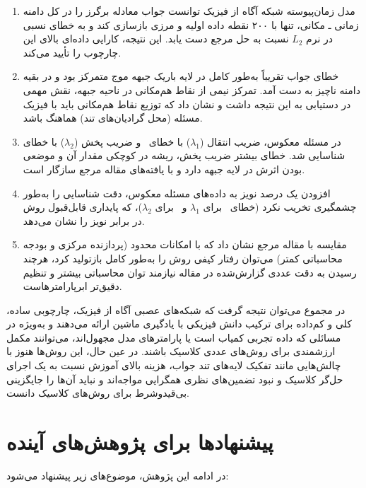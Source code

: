 \begin{enumerate}
\item مدل زمان‌پیوسته شبکه آگاه از فیزیک توانست جواب معادله برگرز را در کل
دامنه زمانی ـ مکانی، تنها با ۲۰۰ نقطه داده اولیه و مرزی بازسازی کند و به
خطای نسبی \FwdRelErr\ در نرم $L_2$ نسبت به حل مرجع دست یابد. این نتیجه،
کارایی داده‌ای بالای این چارچوب را تأیید می‌کند.

\item خطای جواب تقریباً به‌طور کامل در لایه باریک جبهه موج متمرکز بود و در
بقیه دامنه ناچیز به دست آمد. تمرکز نیمی از نقاط هم‌مکانی در ناحیه جبهه،
نقش مهمی در دستیابی به این نتیجه داشت و نشان داد که توزیع نقاط هم‌مکانی
باید با فیزیک مسئله (محل گرادیان‌های تند) هماهنگ باشد.

\item در مسئله معکوس، ضریب انتقال ($\lambda_1$) با خطای \LamIErrClean\ و
ضریب پخش ($\lambda_2$) با خطای \LamIIErrClean\ شناسایی شد. خطای بیشتر ضریب
پخش، ریشه در کوچکی مقدار آن و موضعی بودن اثرش در لایه جبهه دارد و با
یافته‌های مقاله مرجع سازگار است.

\item افزودن یک درصد نویز به داده‌های مسئله معکوس، دقت شناسایی را به‌طور
چشمگیری تخریب نکرد (خطای \LamIErrNoisy\ برای $\lambda_1$ و \LamIIErrNoisy\
برای $\lambda_2$)، که پایداری قابل‌قبول روش در برابر نویز را نشان می‌دهد.

\item مقایسه با مقاله مرجع نشان داد که با امکانات محدود (پردازنده مرکزی و
بودجه محاسباتی کمتر) می‌توان رفتار کیفی روش را به‌طور کامل بازتولید کرد،
هرچند رسیدن به دقت عددی گزارش‌شده در مقاله نیازمند توان محاسباتی بیشتر و
تنظیم دقیق‌تر ابرپارامترهاست.
\end{enumerate}

در مجموع می‌توان نتیجه گرفت که شبکه‌های عصبی آگاه از فیزیک، چارچوبی ساده،
کلی و کم‌داده برای ترکیب دانش فیزیکی با یادگیری ماشین ارائه می‌دهند و
به‌ویژه در مسائلی که داده تجربی کمیاب است یا پارامترهای مدل مجهول‌اند،
می‌توانند مکمل ارزشمندی برای روش‌های عددی کلاسیک باشند. در عین حال، این
روش‌ها هنوز با چالش‌هایی مانند تفکیک لایه‌های تند جواب، هزینه بالای آموزش
نسبت به یک اجرای حل‌گر کلاسیک و نبود تضمین‌های نظری همگرایی مواجه‌اند و
نباید آن‌ها را جایگزینی بی‌قیدوشرط برای روش‌های کلاسیک دانست.

\section{پیشنهادها برای پژوهش‌های آینده}
\label{sec:future}

در ادامه این پژوهش، موضوع‌های زیر پیشنهاد می‌شود:


